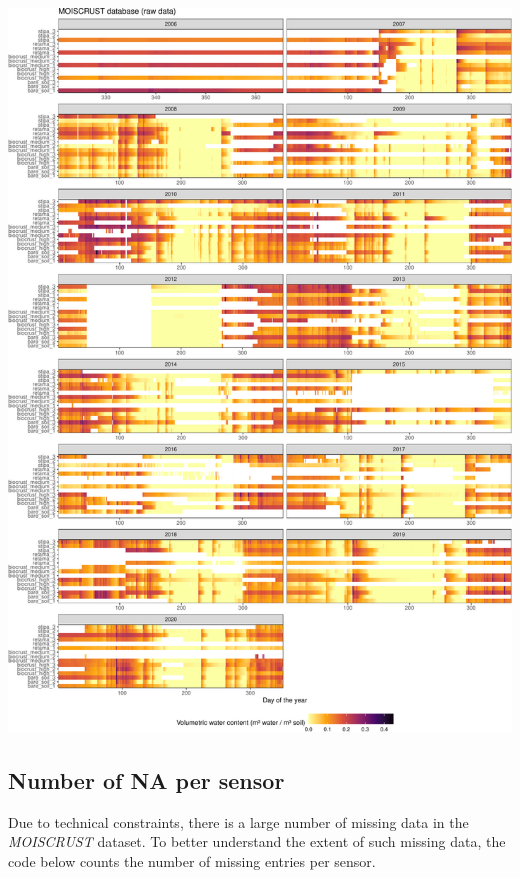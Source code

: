 \documentclass[
  table]{article}
\begin{document}
\includegraphics{moiscrust_files/figure-latex/unnamed-chunk-8-1.pdf}

\hypertarget{number-of-na-per-sensor}{%
\subsection{Number of NA per sensor}\label{number-of-na-per-sensor}}

Due to technical constraints, there is a large number of missing data in
the \emph{MOISCRUST} dataset. To better understand the extent of such
missing data, the code below counts the number of missing entries per
sensor.
\end{document}
